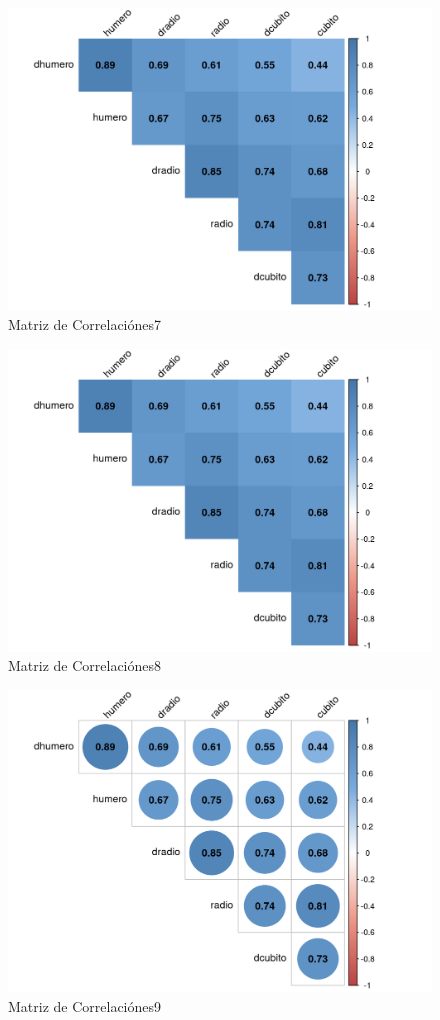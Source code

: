\documentclass[12pt,a4paper,]{book}
\numberwithin{dummy}{section}
\theoremstyle{ocrenumbox}
\theoremstyle{ocrenumbox}
\theoremstyle{ocrenumbox}
\theoremstyle{ocrenumbox}
\theoremstyle{ocrenum}
\begin{document}
\begin{figure}[H]

{\centering \includegraphics[width=0.6\linewidth]{figurasR/grafica1o-1} 

}

\caption{Matriz de Correlaciónes7}\label{fig:grafica1o}
\end{figure}

\begin{figure}[H]

{\centering \includegraphics[width=0.6\linewidth]{figurasR/grafica1p-1} 

}

\caption{Matriz de Correlaciónes8}\label{fig:grafica1p}
\end{figure}

\begin{figure}[H]

{\centering \includegraphics[width=0.6\linewidth]{figurasR/grafica1q-1} 

}

\caption{Matriz de Correlaciónes9}\label{fig:grafica1q}
\end{figure}
\end{document}
